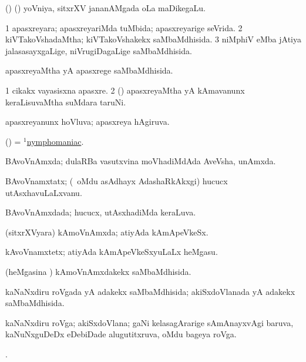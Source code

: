 \bentry
{}
\gl{\nA}
\bmng
(\bava) (\aMrashA) yoVniya, sitxrXV jananAMgada oLa maDikegaLu. 
\emng
\eentry

\bentry
{}
\gl{\gu}
\bmng
\bnum
\num{1} apasxreyara; apasxreyariMda tuMbida; apasxreyarige seVrida. 
\num{2} kiVTakoVshadaMtha; kiVTakoVshakekx saMbaMdhisida. 
\num{3} niMphiV eMba jAtiya jalasasayxgaLige, niVrugiDagaLige saMbaMdhisida. 
\enum
\emng
\eentry

\bentry
{}
\gl{\gu}
\bmng
apasxreyaMtha yA apasxrege saMbaMdhisida. 
\emng
\eentry

\bentry
{}
\gl{\nA}
\bmng
\bnum
\num{1} cikakx vayasisxna apasxre. 
\num{2} (\AmA) apasxreyaMtha yA kAmavanunx keraLisuvaMtha suMdara taruNi. 
\enum
\emng
\eentry

\bentry
{}
\gl{\gu}
\bmng
apasxreyanunx hoVluva; apasxreya hAgiruva. 
\emng
\eentry

\bentry
{}
\gl{\nA}
\bmng
(\AmA) = \hyperlink{nymphomaniac(1)}{$^1$nymphomaniac}. 
\emng
\eentry

\bentry
{}
\gl{\nA}
\bmng
BAvoVnAmxda; dulaRBa vasutxvina moVhadiMdAda AveVsha, unAmxda. 
\emng
\eentry

\bentry
{}
\gl{\nA}
\bmng
BAvoVnamxtatx; (\kanmu\ oMdu asAdhayx AdashaRkAkxgi) hucucx utAsxhavuLaLxvanu. 
\emng
\eentry

\bentry
{}
\gl{\gu}
\bmng
BAvoVnAmxdada; hucucx, utAsxhadiMda keraLuva. 
\emng
\eentry

\bentry
{}
\gl{\nA}
\bmng
(sitxrXVyara) kAmoVnAmxda; atiyAda kAmApeVkeSx. 
\emng
\eentry

\bentry
{}
\gl{\nA}
\bmng
kAvoVnamxtetx; atiyAda kAmApeVkeSxyuLaLx heMgasu. 
\emng
\eentry

\bentry
{}
\gl{\gu}
\bmng
(heMgasina \vi) kAmoVnAmxdakekx saMbaMdhisida. 
\emng
\eentry

\bentry
{}
\gl{\gu}
\bmng
kaNaNxdiru roVgada yA adakekx saMbaMdhisida; akiSxdoVlanada yA adakekx saMbaMdhisida. 
\emng
\eentry

\bentry
{}
\gl{\nA}
\bmng
kaNaNxdiru roVga; akiSxdoVlana; gaNi kelasagArarige sAmAnayxvAgi baruva, kaNuNxguDeDx eDebiDade alugutitxruva, oMdu bageya roVga. 
\emng
\eentry

\bentry
{}
\gl{\saMkiSx}
\bmng
{}. 
\emng
\eentry

